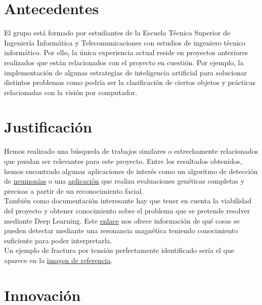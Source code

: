 \documentclass[a4paper,12pt,oneside]{article}
\begin{document}
\section{Antecedentes}

El grupo está formado por estudiantes de la Escuela Técnica Superior de Ingeniería Informática y Telecomunicaciones con estudios de ingeniero técnico informático. Por ello, la única experiencia actual reside en proyectos anteriores realizados que están relacionados con el proyecto en cuestión. Por ejemplo, la implementación de algunas estrategias de inteligencia artificial para solucionar distintos problemas como podría ser la clasificación de ciertos objetos y prácticas relacionadas con la visión por computador.

\section{Justificación}

Hemos realizado una búsqueda de trabajos similares o estrechamente relacionados que puedan ser relevantes para este proyecto. Entre los resultados obtenidos, hemos encontrado algunas aplicaciones de interés como un algoritmo de detección de \href{https://blogthinkbig.com/este-algoritmo-diagnostica-neumonia-con-la-precision-de-un-medico}{neumonías} o una \href{https://www.face2gene.com/}{aplicación} que realiza evaluaciones genéticas completas y precisas a partir de un reconocimiento facial. \\

También como documentación interesante hay que tener en cuenta la viabilidad del proyecto y obtener conocimiento sobre el problema que se pretende resolver mediante Deep Learning. Este \href{https://blog.hospitalsanangelinn.mx/resonancia-magnetica-diagnostico}{enlace} nos ofrece información de qué cosas se pueden detectar mediante una resonancia magnética teniendo conocimiento suficiente para poder interpretarla. \\

Un ejemplo de fractura por tensión perfectamente identificado sería el que aparece en la \href{https://www.google.es/search?q=resonancia+magnetica+con+fractura&source=lnms&tbm=isch&sa=X&ved=0ahUKEwj_ydaisK7eAhVDgRoKHeGoDsUQ_AUIDigB&biw=1536&bih=754#imgrc=5wcLStUv22LjAM:}{imagen de referencia}.

\section{Innovación}
\end{document}
